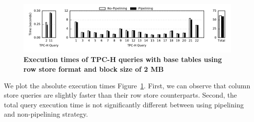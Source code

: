 \begin{figure}
	\centering 
	\includegraphics{pipeline/figures/rowstore-20threads-bs2mb-withlip-alltpch}
	\caption{\textbf{Execution times of TPC-H queries with base tables using row store format and block size of 2 MB}}
	\label{fig:absolute-times-all-tpch-bs2mb-20threads-rowstore}
\end{figure}

We plot the absolute execution times Figure~\ref{fig:absolute-times-all-tpch-bs2mb-20threads-rowstore}.
First, we can observe that column store queries are slightly faster than their row store counterparts. 
Second, the total query execution time is not significantly different between using pipelining and non-pipelining strategy. 

